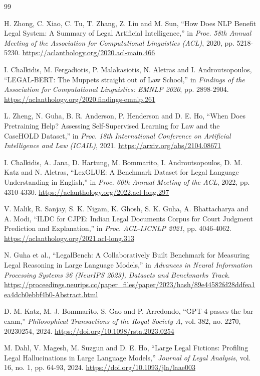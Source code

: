 \begin{thebibliography}{99}


 H. Zhong, C. Xiao, C. Tu, T. Zhang, Z. Liu and M. Sun, ``How Does NLP Benefit Legal System: A Summary of Legal Artificial Intelligence,'' in \emph{Proc. 58th Annual Meeting of the Association for Computational Linguistics (ACL)}, 2020, pp. 5218-5230. \url{https://aclanthology.org/2020.acl-main.466}

 I. Chalkidis, M. Fergadiotis, P. Malakasiotis, N. Aletras and I. Androutsopoulos, ``LEGAL-BERT: The Muppets straight out of Law School,'' in \emph{Findings of the Association for Computational Linguistics: EMNLP 2020}, pp. 2898-2904. \url{https://aclanthology.org/2020.findings-emnlp.261}

 L. Zheng, N. Guha, B. R. Anderson, P. Henderson and D. E. Ho, ``When Does Pretraining Help? Assessing Self-Supervised Learning for Law and the CaseHOLD Dataset,'' in \emph{Proc. 18th International Conference on Artificial Intelligence and Law (ICAIL)}, 2021. \url{https://arxiv.org/abs/2104.08671}

 I. Chalkidis, A. Jana, D. Hartung, M. Bommarito, I. Androutsopoulos, D. M. Katz and N. Aletras, ``LexGLUE: A Benchmark Dataset for Legal Language Understanding in English,'' in \emph{Proc. 60th Annual Meeting of the ACL}, 2022, pp. 4310-4330. \url{https://aclanthology.org/2022.acl-long.297}

 V. Malik, R. Sanjay, S. K. Nigam, K. Ghosh, S. K. Guha, A. Bhattacharya and A. Modi, ``ILDC for CJPE: Indian Legal Documents Corpus for Court Judgment Prediction and Explanation,'' in \emph{Proc. ACL-IJCNLP 2021}, pp. 4046-4062. \url{https://aclanthology.org/2021.acl-long.313}

 N. Guha et al., ``LegalBench: A Collaboratively Built Benchmark for Measuring Legal Reasoning in Large Language Models,'' in \emph{Advances in Neural Information Processing Systems 36 (NeurIPS 2023), Datasets and Benchmarks Track}. \url{https://proceedings.neurips.cc/paper_files/paper/2023/hash/89e44582fd28ddfea1ea4dcb0ebbf4b0-Abstract.html}

 D. M. Katz, M. J. Bommarito, S. Gao and P. Arredondo, ``GPT-4 passes the bar exam,'' \emph{Philosophical Transactions of the Royal Society A}, vol. 382, no. 2270, 20230254, 2024. \url{https://doi.org/10.1098/rsta.2023.0254}

 M. Dahl, V. Magesh, M. Suzgun and D. E. Ho, ``Large Legal Fictions: Profiling Legal Hallucinations in Large Language Models,'' \emph{Journal of Legal Analysis}, vol. 16, no. 1, pp. 64-93, 2024. \url{https://doi.org/10.1093/jla/laae003}


\end{thebibliography}
